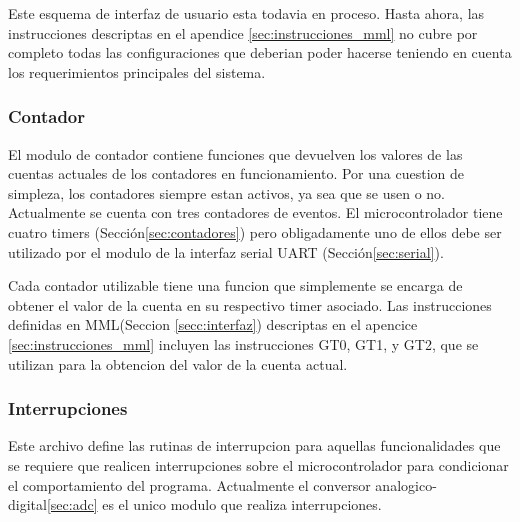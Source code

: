 Este esquema de interfaz de usuario esta todavia en proceso. Hasta ahora, las instrucciones descriptas en el apendice \ref{sec:instrucciones_mml} no cubre por completo todas las configuraciones que deberian poder hacerse teniendo en cuenta los requerimientos principales del sistema.


\subsubsection{Contador}
El modulo de contador contiene funciones que devuelven los valores de las cuentas actuales de los contadores en funcionamiento. Por una cuestion de simpleza, los contadores siempre estan activos, ya sea que se usen o no. Actualmente se cuenta con tres contadores de eventos. El microcontrolador tiene cuatro timers (Secci\'on\ref{sec:contadores}) pero obligadamente uno de ellos debe ser utilizado por el modulo de la interfaz serial UART (Secci\'on\ref{sec:serial}).

Cada contador utilizable tiene una funcion que simplemente se encarga de obtener el valor de la cuenta en su respectivo timer asociado. Las instrucciones definidas en MML(Seccion \ref{secc:interfaz}) descriptas en el apencice \ref{sec:instrucciones_mml} incluyen las instrucciones GT0, GT1, y GT2, que se utilizan para la obtencion del valor de la cuenta actual.
\subsubsection{Interrupciones}
Este archivo define las rutinas de interrupcion para aquellas funcionalidades que se requiere que realicen interrupciones sobre el microcontrolador para condicionar el comportamiento del programa. Actualmente el conversor analogico-digital\ref{sec:adc} es el unico modulo que realiza interrupciones.


